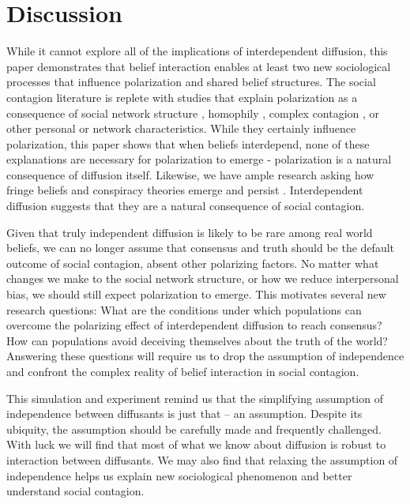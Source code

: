 \documentclass[9pt,twocolumn,twoside,lineno]{pnas-new}
\begin{document}
\section*{Discussion}
While it cannot explore all of the implications of interdependent diffusion, this paper demonstrates that belief interaction enables at least two new sociological processes that influence polarization and shared belief structures. The social contagion literature is replete with studies that explain polarization as a consequence of social network structure \cite{flache2011small,del2016echo}, homophily \cite{dandekar2013biased,vasconcelos2019consensus,axelrod-1997-dissemination}, complex contagion \cite{spohr2017fake,tornberg2018echo}, or other personal or network characteristics. While they certainly influence polarization, this paper shows that when beliefs interdepend, none of these explanations are necessary for polarization to emerge - polarization is a natural consequence of diffusion itself. Likewise, we have ample research asking how fringe beliefs and conspiracy theories emerge and persist \cite{spohr2017fake,tornberg2018echo,pennycook2019lazy}. Interdependent diffusion suggests that they are a natural consequence of social contagion. 

Given that truly independent diffusion is likely to be rare among real world beliefs, we can no longer assume that consensus and truth should be the default outcome of social contagion, absent other polarizing factors. No matter what changes we make to the social network structure, or how we reduce interpersonal bias, we should still expect polarization to emerge. This motivates several new research questions: What are the conditions under which populations can overcome the polarizing effect of interdependent diffusion to reach consensus? How can populations avoid deceiving themselves about the truth of the world? Answering these questions will require us to drop the assumption of independence and confront the complex reality of belief interaction in social contagion.

This simulation and experiment remind us that the simplifying assumption of independence between diffusants is just that – an assumption. Despite its ubiquity, the assumption should be carefully made and frequently challenged. With luck we will find that most of what we know about diffusion is robust to interaction between diffusants. We may also find that relaxing the assumption of independence helps us explain new sociological phenomenon and better understand social contagion.
\end{document}
